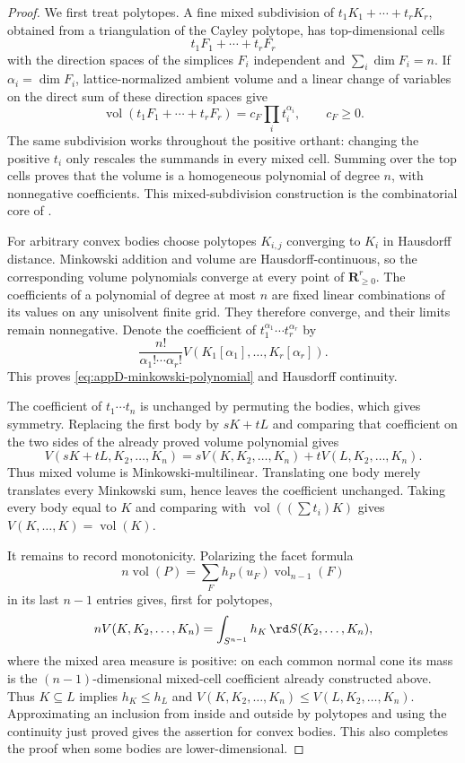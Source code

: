 \begin{proof}
We first treat polytopes.  A fine mixed subdivision of
\(t_1K_1+\cdots+t_rK_r\), obtained from a triangulation of the Cayley
polytope, has top-dimensional cells
\[
                     t_1F_1+\cdots+t_rF_r
\]
with the direction spaces of the simplices \(F_i\) independent and
\(\sum_i\dim F_i=n\).  If \(\alpha_i=\dim F_i\), lattice-normalized
ambient volume and a linear change of variables on the direct sum of these
direction spaces give
\[
 \operatorname{vol}(t_1F_1+\cdots+t_rF_r)
       =c_F\prod_i t_i^{\alpha_i},\qquad c_F\geq0.
\]
The same subdivision works throughout the positive orthant: changing the
positive \(t_i\) only rescales the summands in every mixed cell.  Summing
over the top cells proves that the volume is a homogeneous polynomial of
degree \(n\), with nonnegative coefficients.  This mixed-subdivision
construction is the combinatorial core of
\cite[Theorem~5.1.7]{Sch14}.

For arbitrary convex bodies choose polytopes \(K_{i,j}\) converging to
\(K_i\) in Hausdorff distance.  Minkowski addition and volume are
Hausdorff-continuous, so the corresponding volume polynomials converge at
every point of \(\mathbf R_{\geq0}^r\).  The coefficients of a polynomial
of degree at most \(n\) are fixed linear combinations of its values on any
unisolvent finite grid.  They therefore converge, and their limits remain
nonnegative.  Denote the coefficient of
\(t_1^{\alpha_1}\cdots t_r^{\alpha_r}\) by
\[
       \frac{n!}{\alpha_1!\cdots\alpha_r!}
       V(K_1[\alpha_1],\ldots,K_r[\alpha_r]).
\]
This proves \eqref{eq:appD-minkowski-polynomial} and Hausdorff
continuity.

The coefficient of \(t_1\cdots t_n\) is unchanged by permuting the
bodies, which gives symmetry.  Replacing the first body by \(sK+tL\) and
comparing that coefficient on the two sides of the already proved volume
polynomial gives
\[
 V(sK+tL,K_2,\ldots,K_n)
 =sV(K,K_2,\ldots,K_n)+tV(L,K_2,\ldots,K_n).
\]
Thus mixed volume is Minkowski-multilinear.  Translating one body merely
translates every Minkowski sum, hence leaves the coefficient unchanged.
Taking every body equal to \(K\) and comparing with
\(\operatorname{vol}((\sum t_i)K)\) gives
\(V(K,\ldots,K)=\operatorname{vol}(K)\).

It remains to record monotonicity.  Polarizing the facet formula
\[
 n\operatorname{vol}(P)
    =\sum_F h_P(u_F)\operatorname{vol}_{n-1}(F)
\]
in its last \(n-1\) entries gives, first for polytopes,
\[
 nV(K,K_2,\ldots,K_n)
   =\int_{S^{n-1}}h_K\,\rd S(K_2,\ldots,K_n),
\]
where the mixed area measure is positive: on each common normal cone its
mass is the \((n-1)\)-dimensional mixed-cell coefficient already
constructed above.  Thus \(K\subseteq L\) implies \(h_K\leq h_L\) and
\(V(K,K_2,\ldots,K_n)\leq V(L,K_2,\ldots,K_n)\).
Approximating an inclusion from inside and outside by polytopes and using
the continuity just proved gives the assertion for convex bodies.  This
also completes the proof when some bodies are lower-dimensional.
\end{proof}

